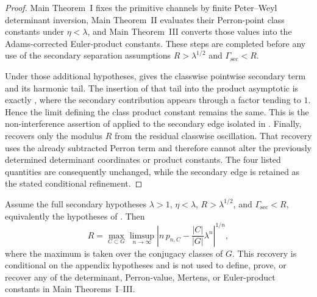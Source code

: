 \begin{proof}
  Main Theorem~I fixes the primitive channels by finite Peter--Weyl
  determinant inversion, Main Theorem~II evaluates their Perron-point class
  constants under \(\eta<\lambda\), and Main Theorem~III converts those
  values into the Adams-corrected Euler-product constants.  These steps are
  completed before any use of the secondary separation assumptions
  \(R>\lambda^{1/2}\) and \(\Gamma_{\mathrm{sec}}<R\).

  Under those additional hypotheses,
   gives the classwise pointwise
  secondary term and its harmonic tail.  The insertion of that tail into the
  product asymptotic is exactly
  , where the secondary contribution
  appears through a factor tending to \(1\).  Hence the limit defining the
  class product constant remains the same.  This is the non-interference
  assertion of  applied to
  the secondary edge isolated in .
  Finally,  recovers only the
  modulus \(R\) from the residual classwise oscillation.  That recovery uses
  the already subtracted Perron term and therefore cannot alter the previously
  determined determinant coordinates or product constants.  The four listed
  quantities are consequently unchanged, while the secondary edge is retained
  as the stated conditional refinement.
\end{proof}

\begin{corollary}
  \label{cor:class-secondary-term-detects-spectrum}
  Assume the full secondary hypotheses \(\lambda>1\),
  \(\eta<\lambda\), \(R>\lambda^{1/2}\), and
  \(\Gamma_{\mathrm{sec}}<R\), equivalently the hypotheses of
  .  Then
  \[
    R
    =
    \max_{C\subset G}
      \limsup_{n\to\infty}
      \left|
        n\,p_{n,C}-\frac{|C|}{|G|}\lambda^n
      \right|^{1/n},
  \]
  where the maximum is taken over the conjugacy classes of \(G\).  This
  recovery is conditional on the appendix hypotheses and is not used to
  define, prove, or recover any of the determinant, Perron-value, Mertens,
  or Euler-product constants in Main Theorems~I--III.

\end{corollary}

